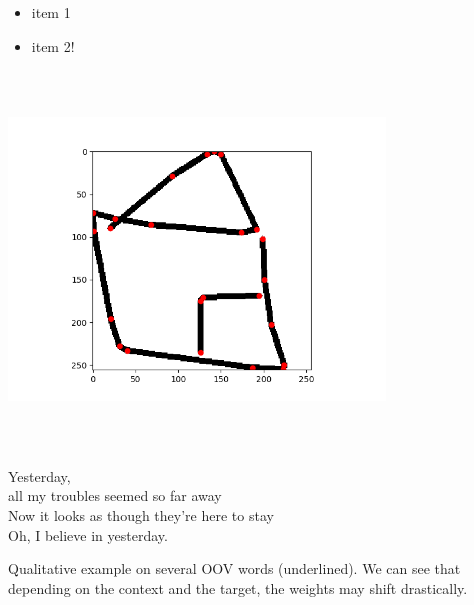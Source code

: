 \begin{multicols}{4}
\begin{itemize}
\item item 1
\item item 2!
\end{itemize}
\end{multicols}





\begin{minipage}{0.3\textwidth}%
\includegraphics[width=10cm,height=10cm,keepaspectratio]{figures/housedraw.png}
\end{minipage}%

\begin{minipage}{0.6\textwidth}
Yesterday,\\
all my troubles seemed so far away\\
Now it looks as though they're here to stay\\
Oh, I believe in yesterday.
\end{minipage}






















\vspace{2mm}
Qualitative example on several OOV words (underlined). We can see that depending on the context and the target, the weights may shift drastically.

